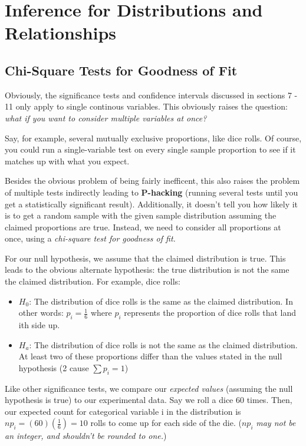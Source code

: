 \documentclass[12pt, a4paper]{article}
\theoremstyle{definition}
\begin{document}
\section{Inference for Distributions and Relationships}

\subsection{Chi-Square Tests for Goodness of Fit}
Obviously, the significance tests and confidence intervals discussed in sections 7 - 11 only apply to single continous variables.
This obviously raises the question: \textit{what if you want to consider multiple variables at once?}

Say, for example, several mutually exclusive proportions, like dice rolls.
Of course, you could run a single-variable test on every single sample proportion to see if it matches up with what you expect.

Besides the obvious problem of being fairly inefficent, this also raises the problem of multiple tests indirectly leading to \textbf{P-hacking} (running several tests until you get a statistically significant result).
Additionally, it doesn't tell you how likely it is to get a random sample with the given sample distribution assuming the claimed proportions are true.
Instead, we need to consider all proportions at once, using a \textit{chi-square test for goodness of fit.}

For our null hypothesis, we assume that the claimed distribution is true.
This leads to the obvious alternate hypothesis: the true distribution is not the same the claimed distribution.
For example, dice rolls:
\begin{itemize}
    \item $H_0$: The distribution of dice rolls is the same as the claimed distribution.
    In other words: $p_i = \frac{1}{6}$ where $p_i$ represents the proportion of dice rolls that land ith side up.
    \item $H_a$: The distribution of dice rolls is not the same as the claimed distribution.
    At least two of these proportions differ than the values stated in the null hypothesis (2 cause $\sum p_i = 1$) 
\end{itemize}

Like other significance tests, we compare our \textit{expected values} (assuming the null hypothesis is true) to our experimental data.
Say we roll a dice 60 times. Then, our expected count for categorical variable i in the distribution is $np_i = (60)(\frac{1}{6}) = 10$ rolls to come up for each side of the die.
($np_i$ \textit{may not be an integer, and shouldn't be rounded to one.})
\end{document}
